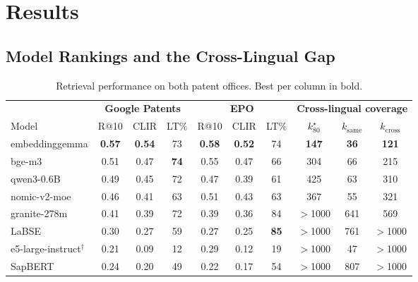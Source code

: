 \section{Results}

\subsection{Model Rankings and the Cross-Lingual Gap}


\begin{table}[t]
\centering
\small
\setlength{\tabcolsep}{5pt}
\begin{tabular}{l ccc ccc ccc}
\toprule
 & \multicolumn{3}{c}{\textbf{Google Patents}} & \multicolumn{3}{c}{\textbf{EPO}} & \multicolumn{3}{c}{\textbf{Cross-lingual coverage}} \\
\cmidrule(lr){2-4}\cmidrule(lr){5-7}\cmidrule(lr){8-10}
Model & R@10 & CLIR & LT\% & R@10 & CLIR & LT\% & $k^\star_{80}$ & $k_{\mathrm{same}}$ & $k_{\mathrm{cross}}$ \\
\midrule
embeddinggemma            & \textbf{0.57} & \textbf{0.54} & 73          & \textbf{0.58} & \textbf{0.52} & 74          & \textbf{147}   & \textbf{36} & \textbf{121} \\
bge-m3                    & 0.51          & 0.47          & \textbf{74} & 0.55          & 0.47          & 66          & 304            & 66          & 215 \\
qwen3-0.6B                & 0.49          & 0.45          & 72          & 0.47          & 0.39          & 61          & 425            & 63          & 310 \\
nomic-v2-moe              & 0.46          & 0.41          & 63          & 0.51          & 0.43          & 63          & 367            & 55          & 321 \\
granite-278m              & 0.41          & 0.39          & 72          & 0.39          & 0.36          & 84          & $>$1000        & 641         & 569 \\
LaBSE                     & 0.30          & 0.27          & 59          & 0.27          & 0.25          & \textbf{85} & $>$1000        & 761         & $>$1000 \\
e5-large-instruct$^\dagger$ & 0.21        & 0.09          & 12          & 0.29          & 0.12          & 19          & $>$1000        & 47          & $>$1000 \\
SapBERT                   & 0.24          & 0.20          & 49          & 0.22          & 0.17          & 54          & $>$1000        & 807         & $>$1000 \\
\bottomrule
\end{tabular}
\caption{Retrieval performance on both patent offices. Best per column in bold.}
\label{tab:main-results}
\end{table}

